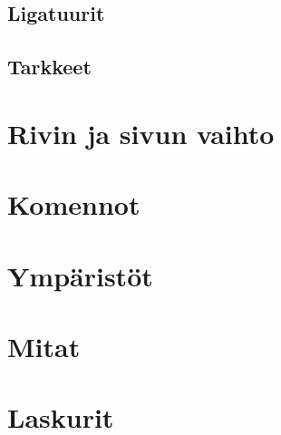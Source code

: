 \subsection{Ligatuurit}
\subsection{Tarkkeet}
\label{luku:tarkkeet}
\section{Rivin ja sivun vaihto}
\section{Komennot}
\label{luku:komennot}
\section{Ympäristöt}
\label{luku:ymparistot}
\section{Mitat}
\section{Laskurit}

